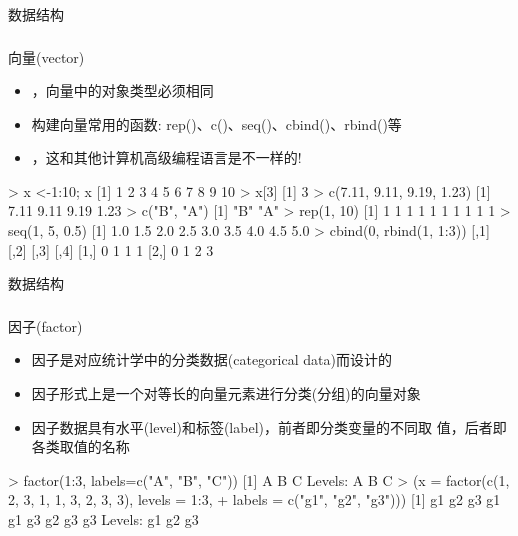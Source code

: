 \documentclass{beamerthemeMono}
\begin{document}
\begin{frame}[t,fragile]{\subsecname}{数据结构}
  \frametitle{}{向量(vector)}
  \begin{itemize}
  \item {}，向量中的对象类型必须相同
  \item 构建向量常用的函数: rep()、c()、seq()、cbind()、rbind()等
  \item {}，这和其他计算机高级编程语言是不一样的!
  \end{itemize}  

\begin{rcode}
> x <-1:10; x
[1]  1  2  3  4  5  6  7  8  9 10
> x[3]
[1] 3
> c(7.11, 9.11, 9.19, 1.23)
[1] 7.11 9.11 9.19 1.23
> c("B", "A")
[1] "B" "A"
> rep(1, 10)
[1] 1 1 1 1 1 1 1 1 1 1
> seq(1, 5, 0.5)
[1] 1.0 1.5 2.0 2.5 3.0 3.5 4.0 4.5 5.0
> cbind(0, rbind(1, 1:3))
     [,1] [,2] [,3] [,4]
[1,]    0    1    1    1
[2,]    0    1    2    3
\end{rcode}  
\end{frame}

\begin{frame}[t,fragile]{\subsecname}{数据结构}
  \frametitle{}{因子(factor)}
  \begin{itemize}
  \item 因子是对应统计学中的分类数据(categorical data)而设计的
  \item 因子形式上是一个对等长的向量元素进行分类(分组)的向量对象
  \item 因子数据具有水平(level)和标签(label)，前者即分类变量的不同取
值，后者即各类取值的名称
  \end{itemize}  

\begin{rcode}
> factor(1:3, labels=c("A", "B", "C"))
[1] A B C
Levels: A B C
> (x = factor(c(1, 2, 3, 1, 1, 3, 2, 3, 3), levels = 1:3,
+   labels = c("g1", "g2", "g3")))
[1] g1 g2 g3 g1 g1 g3 g2 g3 g3
Levels: g1 g2 g3
\end{rcode}  
\end{frame}
\end{document}
